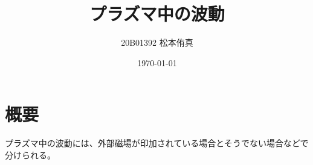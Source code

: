
\title{プラズマ中の波動}
\author{20B01392 松本侑真}
\date{\today}

\maketitle
\begin{abstract}

\end{abstract}
\tableofcontents
\newpage

\section{概要}
プラズマ中の波動には、外部磁場が印加されている場合とそうでない場合などで分けられる。

